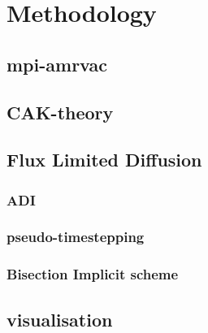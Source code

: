 \section{Methodology}

\subsection{mpi-amrvac}

\subsection{CAK-theory}

\subsection{Flux Limited Diffusion}

\subsubsection{ADI}
\subsubsection{pseudo-timestepping}
\subsubsection{Bisection Implicit scheme}

\subsection{visualisation}